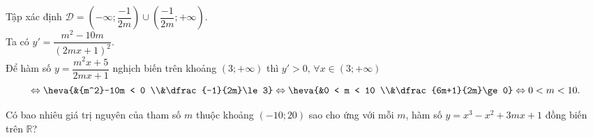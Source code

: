 \begin{bt}
{\begin{enumerate}
\begin{itemize}
				Tập  xác định $\mathscr{D}=\left(-\infty;\dfrac{-1}{2m}\right)\cup\left(\dfrac{-1}{2m};+\infty\right)$.\\
				Ta có $y'=\dfrac{m^2-10m}{\left(2mx+1\right)^2}$.\\ 
				Để hàm số $y=\dfrac{m^2x+5}{2mx+1}$ nghịch biến trên khoảng  $\left(3;+\infty\right)$ thì $y'>0,\,\forall x\in \left(3;+\infty\right)$
				\[\Leftrightarrow \heva{&{m^2}-10m < 0 \\&\dfrac{-1}{2m}\le 3}\Leftrightarrow \heva{&0 < m < 10 \\&\dfrac{6m+1}{2m}\ge 0}\Leftrightarrow 0  < m < 10.\]
			\end{itemize}
		\end{enumerate}
	 }
\end{bt}

\begin{bt}%
    Có bao nhiêu giá trị nguyên của tham số $m$ thuộc khoảng $(-10;20)$ sao cho ứng với mỗi $m$, hàm số $y=x^3-x^2+3mx+1$ đồng biến trên $\mathbb{R}$?
\end{bt}


